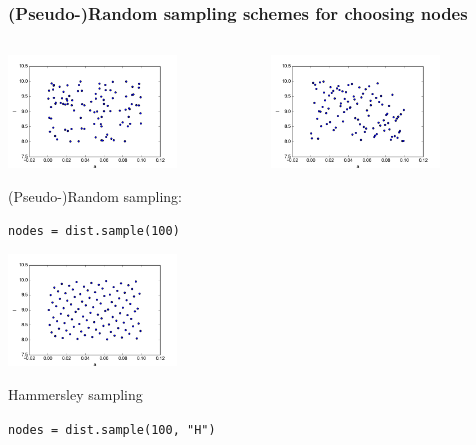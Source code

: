 \documentclass{beamer}
\begin{document}
  \begin{frame}[fragile]
 \frametitle{(Pseudo-)Random sampling schemes for choosing nodes}
 \begin{columns}
     \begin{center}
                \includegraphics[width=0.7\textwidth]{samples.png}

                (Pseudo-)Random sampling:

                \scriptsize
                \verb;nodes = dist.sample(100);
                \normalsize

                \includegraphics[width=0.7\textwidth]{samples_M.png}

                Hammersley sampling

                \scriptsize
                \verb;nodes = dist.sample(100, "H");
                \normalsize

     \end{center}
     \begin{center}
                  \includegraphics[width=0.7\textwidth]{samples_L.png}


\end{center}
\end{columns}
\end{frame}
\end{document}
